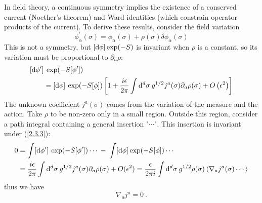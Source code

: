 In field theory, a continuous symmetry implies the existence of a conserved current (Noether's theorem) and Ward identities (which constrain operator products of the current). To derive these results, consider the field variation    
\begin{equation}\label{2.3.3}
	\phi_{\alpha}^{\prime}(\sigma)=\phi_{\alpha}(\sigma)+\rho(\sigma) \delta \phi_{\alpha}(\sigma)
\end{equation}
This is not a symmetry, but $[\mathrm{d} \phi]\exp(-S)$ is invariant when $\rho$ is a constant, so its variation must be proportional to $\partial _a \rho$:    
\begin{align}
	&[\mathrm{d} \phi^{\prime}]\: \exp (-S[\phi^{\prime}]) \nonumber \\
	&\qquad=[\mathrm{d} \phi] \: \exp (-S[\phi])\left[1+\frac{i \epsilon}{2 \pi} \int \mathrm{d}^{d} \sigma\: 
	g^{1 / 2} j^{a}(\sigma) \partial_{a} \rho(\sigma)+O\left(\epsilon^{2}\right)\right] \label{2.3.4}
\end{align}
The unknown coefficient $j^a(\sigma)$ comes from the variation of the measure and the action.    
Take $\rho$ to be non-zero only in a small region. Outside this region, consider a path integral containing a general insertion "$\cdots$".    
This insertion is invariant under (\ref{2.3.3}):    
\begin{align}
	0 &=\int[\mathrm{d} \phi^{\prime}]\: \exp (-S[\phi^{\prime}]) \cdots \: - \: \int[\mathrm{d} \phi] \exp (-S[\phi]) \cdots \nonumber \\
	&=\frac{i \epsilon}{2 \pi} \int \mathrm{d}^{d} \sigma\: 
	g^{1 / 2} j^{a}(\sigma) \partial_{a} \rho(\sigma)+O(\epsilon^2)=\frac{\epsilon}{2 \pi i} \int \mathrm{d}^{d} \sigma \: g^{1 / 2} \rho(\sigma)\left\langle\nabla_{a} j^{a}(\sigma) \cdots\right\rangle
	\label{2.3.5}
\end{align}
thus we have    
\begin{equation}
	\nabla_{a} j^{a}=0 \:.
	\label{2.3.6}
\end{equation}
